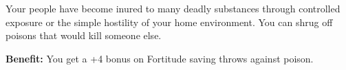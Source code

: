
Your people have become inured to many deadly substances through controlled exposure or the simple hostility of your home environment. You can shrug off poisons that would kill someone else.

\textbf{Benefit:} You get a +4 bonus on Fortitude saving throws against poison.